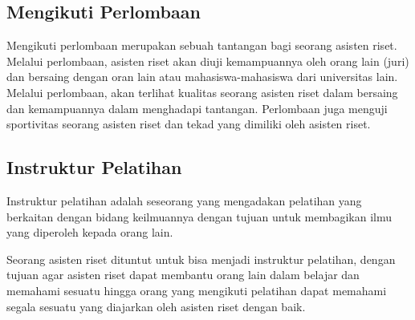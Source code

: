 \subsection{Mengikuti Perlombaan}
\par
Mengikuti perlombaan merupakan sebuah tantangan bagi seorang asisten riset. Melalui perlombaan, asisten riset akan diuji kemampuannya oleh orang lain (juri) dan bersaing dengan oran lain atau mahasiswa-mahasiswa dari universitas lain. Melalui perlombaan, akan terlihat kualitas seorang asisten riset dalam bersaing dan kemampuannya dalam menghadapi tantangan. Perlombaan juga menguji sportivitas seorang asisten riset dan tekad yang dimiliki oleh asisten riset.

\subsection{Instruktur Pelatihan}
\par
Instruktur pelatihan adalah seseorang yang mengadakan pelatihan yang berkaitan dengan bidang keilmuannya dengan tujuan untuk membagikan ilmu yang diperoleh kepada orang lain.\\
\par 
Seorang asisten riset dituntut untuk bisa menjadi instruktur pelatihan, dengan tujuan agar asisten riset dapat membantu orang lain dalam belajar dan memahami sesuatu hingga orang yang mengikuti pelatihan dapat memahami segala sesuatu yang diajarkan oleh asisten riset dengan baik.